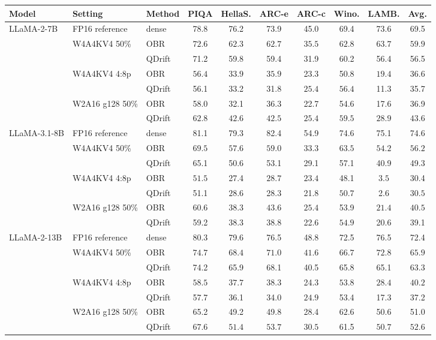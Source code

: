 \begin{tabular}{lllccccccc}
\toprule
Model & Setting & Method & PIQA & HellaS. & ARC-e & ARC-c & Wino. & LAMB. & Avg. \\
\midrule
LLaMA-2-7B & FP16 reference & dense & 78.8 & 76.2 & 73.9 & 45.0 & 69.4 & 73.6 & 69.5 \\
 & W4A4KV4 50\% & OBR & $\mathbf{72.6}$ & $\mathbf{62.3}$ & $\mathbf{62.7}$ & $\mathbf{35.5}$ & $\mathbf{62.8}$ & $\mathbf{63.7}$ & $\mathbf{59.9}$ \\
 &  & QDrift & 71.2 & 59.8 & 59.4 & 31.9 & 60.2 & 56.4 & 56.5 \\
 & W4A4KV4 4:8p & OBR & $\mathbf{56.4}$ & $\mathbf{33.9}$ & $\mathbf{35.9}$ & 23.3 & 50.8 & $\mathbf{19.4}$ & $\mathbf{36.6}$ \\
 &  & QDrift & 56.1 & 33.2 & 31.8 & $\mathbf{25.4}$ & $\mathbf{56.4}$ & 11.3 & 35.7 \\
 & W2A16 g128 50\% & OBR & 58.0 & 32.1 & 36.3 & 22.7 & 54.6 & 17.6 & 36.9 \\
 &  & QDrift & $\mathbf{62.8}$ & $\mathbf{42.6}$ & $\mathbf{42.5}$ & $\mathbf{25.4}$ & $\mathbf{59.5}$ & $\mathbf{28.9}$ & $\mathbf{43.6}$ \\
\midrule
LLaMA-3.1-8B & FP16 reference & dense & 81.1 & 79.3 & 82.4 & 54.9 & 74.6 & 75.1 & 74.6 \\
 & W4A4KV4 50\% & OBR & $\mathbf{69.5}$ & $\mathbf{57.6}$ & $\mathbf{59.0}$ & $\mathbf{33.3}$ & $\mathbf{63.5}$ & $\mathbf{54.2}$ & $\mathbf{56.2}$ \\
 &  & QDrift & 65.1 & 50.6 & 53.1 & 29.1 & 57.1 & 40.9 & 49.3 \\
 & W4A4KV4 4:8p & OBR & $\mathbf{51.5}$ & 27.4 & $\mathbf{28.7}$ & $\mathbf{23.4}$ & 48.1 & $\mathbf{3.5}$ & 30.4 \\
 &  & QDrift & 51.1 & $\mathbf{28.6}$ & 28.3 & 21.8 & $\mathbf{50.7}$ & 2.6 & $\mathbf{30.5}$ \\
 & W2A16 g128 50\% & OBR & $\mathbf{60.6}$ & 38.3 & $\mathbf{43.6}$ & $\mathbf{25.4}$ & 53.9 & $\mathbf{21.4}$ & $\mathbf{40.5}$ \\
 &  & QDrift & 59.2 & 38.3 & 38.8 & 22.6 & $\mathbf{54.9}$ & 20.6 & 39.1 \\
\midrule
LLaMA-2-13B & FP16 reference & dense & 80.3 & 79.6 & 76.5 & 48.8 & 72.5 & 76.5 & 72.4 \\
 & W4A4KV4 50\% & OBR & $\mathbf{74.7}$ & $\mathbf{68.4}$ & $\mathbf{71.0}$ & $\mathbf{41.6}$ & $\mathbf{66.7}$ & $\mathbf{72.8}$ & $\mathbf{65.9}$ \\
 &  & QDrift & 74.2 & 65.9 & 68.1 & 40.5 & 65.8 & 65.1 & 63.3 \\
 & W4A4KV4 4:8p & OBR & $\mathbf{58.5}$ & $\mathbf{37.7}$ & $\mathbf{38.3}$ & 24.3 & $\mathbf{53.8}$ & $\mathbf{28.4}$ & $\mathbf{40.2}$ \\
 &  & QDrift & 57.7 & 36.1 & 34.0 & $\mathbf{24.9}$ & 53.4 & 17.3 & 37.2 \\
 & W2A16 g128 50\% & OBR & 65.2 & 49.2 & 49.8 & 28.4 & $\mathbf{62.6}$ & 50.6 & 51.0 \\
 &  & QDrift & $\mathbf{67.6}$ & $\mathbf{51.4}$ & $\mathbf{53.7}$ & $\mathbf{30.5}$ & 61.5 & $\mathbf{50.7}$ & $\mathbf{52.6}$ \\
\bottomrule
\end{tabular}
